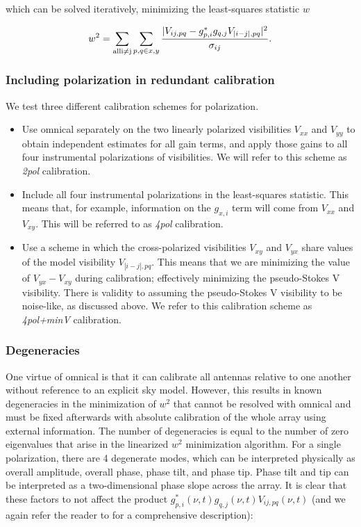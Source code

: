 which can be solved iteratively, minimizing the least-squares statistic $w$

\begin{equation}
w^2 = \sum_{\rm{all } i \neq j} \sum_{p,q \in x,y}\frac{|V_{ij,pq} -  g^*_{p,i} g_{q,j} V_{|i-j|,pq}|^2}{\sigma_{ij}}.
\label{eq:polcal_w2}
\end{equation}

\subsubsection{Including polarization in redundant calibration}
\label{subsec:calSchemes}

We test three different calibration schemes for polarization. 

\begin{itemize}
\item Use {\sc omnical} separately on the two linearly polarized visibilities $V_{xx}$ and $V_{yy}$ to obtain independent estimates for all gain terms, and apply those gains to all four instrumental polarizations of visibilities. We will refer to this scheme as \textit{2pol} calibration. 

\item Include all four instrumental polarizations in the least-squares statistic. This means that, for example, information on the $g_{x,i}$ term will come from $V_{xx}$ and $V_{xy}$. This will be referred to as \textit{4pol} calibration. 

\item Use a scheme in which the cross-polarized visibilities $V_{xy}$ and $V_{yx}$ share values of the model visibility $V_{|i-j|,pq}$. This means that we are minimizing the value of $V_{yx} - V_{xy}$ during calibration; effectively minimizing the pseudo-Stokes V visibility. There is validity to assuming the pseudo-Stokes V visibility to be noise-like, as discussed above. We refer to this calibration scheme as \textit{4pol+minV} calibration.
\end{itemize} 

\subsubsection{Degeneracies}
\label{subsubsec:degen}

One virtue of {\sc omnical} is that it can calibrate all antennas relative to one another without reference to an explicit sky model. However, this results in known degeneracies in the minimization of $w^2$ that cannot be resolved with {\sc omnical} and must be fixed afterwards with absolute calibration of the whole array using external information. The number of degeneracies is equal to the number of zero eigenvalues that arise in the linearized $w^2$ minimization algorithm. For a single polarization, there are 4 degenerate modes, which can be interpreted physically as overall amplitude, overall phase, phase tilt, and phase tip. Phase tilt and tip can be interpreted as a two-dimensional phase slope across the array. It is clear that these factors to not affect the product $g^*_{p,i}(\nu,t) g_{q,j}(\nu,t)V_{ij,pq}(\nu, t)$ (and we again refer the reader to \cite{Dillon.17} for a comprehensive description):

